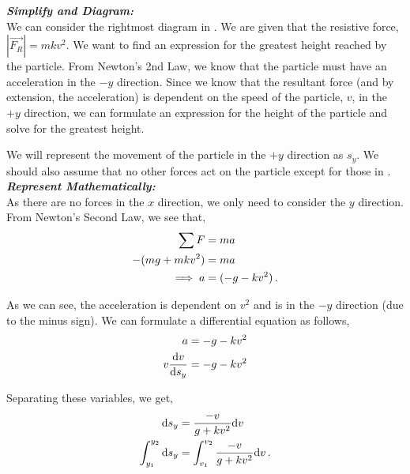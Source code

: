\begin{subquestions}
\textbf{\textit{Simplify and Diagram:}} \\
We can consider the rightmost diagram in . We are given that the resistive force, $|\vec{F_R}| = mkv^2$. We want to find an expression for the greatest height reached by the particle. From Newton's 2nd Law, we know that the particle must have an acceleration in the $-y$ direction. Since we know that the resultant force (and by extension, the acceleration) is dependent on the speed of the particle, $v$, in the $+y$ direction, we can formulate an expression for the height of the particle and solve for the greatest height.

We will represent the movement of the particle in the $+y$ direction as $s_y$.
We should also assume that no other forces act on the particle except for those in . \\




\textbf{\textit{Represent Mathematically:}} \\
As there are no forces in the $x$ direction, we only need to consider the $y$ direction. From Newton's Second Law, we see that,
\begin{align}
	\sum F & = ma \nonumber \\
	-(mg+mkv^2)  & = ma  \nonumber \\
	\implies a  & = (-g -kv^2) \,.
\end{align}

As we can see, the acceleration is dependent on $v^2$ and is in the $-y$ direction (due to the minus sign). We can formulate a differential equation as follows,
\begin{align}
	a & = -g -kv^2 \nonumber \\
	v \frac{\mathrm{d}v}{\mathrm{d}s_y} & = -g - kv^2 \nonumber \\
\end{align}

Separating these variables, we get,
\begin{align}
	\mathrm{d} s_y & = \frac{-v}{g+kv^2}\mathrm{d} v \nonumber \\
	\int_{y_1}^{y_2} \mathrm{d} s_y & = \int_{v_1}^{v_2} \frac{-v}{g+kv^2}\mathrm{d} v \,.
\end{align}





\end{subquestions}
